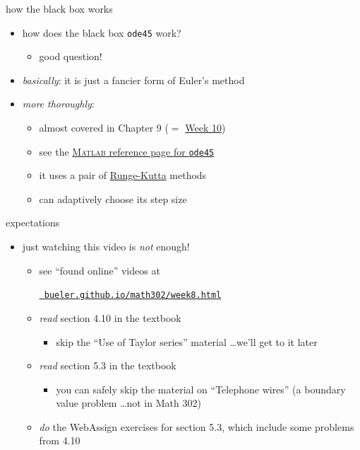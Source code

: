 \documentclass[urlcolor=blue,dvipsnames]{beamer}
\newcommand{\Matlab}{\textsc{Matlab}\xspace}
\begin{document}
\begin{frame}{how the black box works}

\begin{itemize}
\item how does the black box \texttt{ode45} work?
    \begin{itemize}
    \item good question!
    \end{itemize}
\item \emph{basically}:  it is just a fancier form of Euler's method
\item \emph{more thoroughly}:
    \begin{itemize}
    \item almost covered in Chapter 9 ($=$ \href{https://bueler.github.io/math302/week10.html}{Week 10})
    \item see the \href{https://www.mathworks.com/help/matlab/ref/ode45.html}{\Matlab reference page for \texttt{ode45}}
    \item it uses a pair of \href{https://en.wikipedia.org/wiki/Runge_Kutta_methods}{Runge-Kutta} methods
    \item can adaptively choose its step size
    \end{itemize}
\end{itemize}
\end{frame}


\begin{frame}{expectations}

\begin{itemize}
\item just watching this video is \emph{not} enough!
     \begin{itemize}
     \item see ``found online'' videos at

     \centerline{\href{https://bueler.github.io/math302/week8.html}{\tt \color{cyan} bueler.github.io/math302/week8.html}}
     \item \emph{read} section 4.10 in the textbook
         \begin{itemize}
         \item skip the ``Use of Taylor series'' material \dots we'll get to it later
         \end{itemize}
     \item \emph{read} section 5.3 in the textbook
         \begin{itemize}
         \item you can safely skip the material on ``Telephone wires'' (a boundary value problem \dots not in Math 302)
         \end{itemize}
     \item \emph{do} the WebAssign exercises for section 5.3, which include some problems from 4.10
     \end{itemize}
\end{itemize}
\end{frame}
\end{document}
